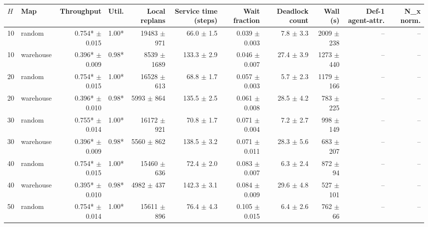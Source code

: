 \begin{tabular}{llrrrrrrrrr}
\toprule
$H$ & Map & Throughput & Util. & Local replans & Service time (steps) & Wait fraction & Deadlock count & Wall (s) & Def-1 agent-attr. & N_x norm. \\
\midrule
10 & random & \num{0.754}* $\pm$ \num{0.015} & \num{1.00}* & \num{19483} $\pm$ \num{971} & \num{66.0} $\pm$ \num{1.5} & \num{0.039} $\pm$ \num{0.003} & \num{7.8} $\pm$ \num{3.3} & \num{2009} $\pm$ \num{238} & -- & -- \\
10 & warehouse & \num{0.396}* $\pm$ \num{0.009} & \num{0.98}* & \num{8539} $\pm$ \num{1689} & \num{133.3} $\pm$ \num{2.9} & \num{0.046} $\pm$ \num{0.007} & \num{27.4} $\pm$ \num{3.9} & \num{1273} $\pm$ \num{440} & -- & -- \\
20 & random & \num{0.754}* $\pm$ \num{0.015} & \num{1.00}* & \num{16528} $\pm$ \num{613} & \num{68.8} $\pm$ \num{1.7} & \num{0.057} $\pm$ \num{0.003} & \num{5.7} $\pm$ \num{2.3} & \num{1179} $\pm$ \num{166} & -- & -- \\
20 & warehouse & \num{0.396}* $\pm$ \num{0.010} & \num{0.98}* & \num{5993} $\pm$ \num{864} & \num{135.5} $\pm$ \num{2.5} & \num{0.061} $\pm$ \num{0.008} & \num{28.5} $\pm$ \num{4.2} & \num{783} $\pm$ \num{225} & -- & -- \\
30 & random & \num{0.755}* $\pm$ \num{0.014} & \num{1.00}* & \num{16172} $\pm$ \num{921} & \num{70.8} $\pm$ \num{1.7} & \num{0.071} $\pm$ \num{0.004} & \num{7.2} $\pm$ \num{2.7} & \num{998} $\pm$ \num{149} & -- & -- \\
30 & warehouse & \num{0.396}* $\pm$ \num{0.009} & \num{0.98}* & \num{5560} $\pm$ \num{862} & \num{138.5} $\pm$ \num{3.2} & \num{0.071} $\pm$ \num{0.011} & \num{28.3} $\pm$ \num{5.6} & \num{683} $\pm$ \num{207} & -- & -- \\
40 & random & \num{0.754}* $\pm$ \num{0.015} & \num{1.00}* & \num{15460} $\pm$ \num{636} & \num{72.4} $\pm$ \num{2.0} & \num{0.083} $\pm$ \num{0.007} & \num{6.3} $\pm$ \num{2.4} & \num{872} $\pm$ \num{94} & -- & -- \\
40 & warehouse & \num{0.395}* $\pm$ \num{0.010} & \num{0.98}* & \num{4982} $\pm$ \num{437} & \num{142.3} $\pm$ \num{3.1} & \num{0.084} $\pm$ \num{0.009} & \num{29.6} $\pm$ \num{4.8} & \num{527} $\pm$ \num{101} & -- & -- \\
50 & random & \num{0.754}* $\pm$ \num{0.014} & \num{1.00}* & \num{15611} $\pm$ \num{896} & \num{76.4} $\pm$ \num{4.3} & \num{0.105} $\pm$ \num{0.015} & \num{6.4} $\pm$ \num{2.6} & \num{762} $\pm$ \num{66} & -- & -- \\

\end{tabular}

